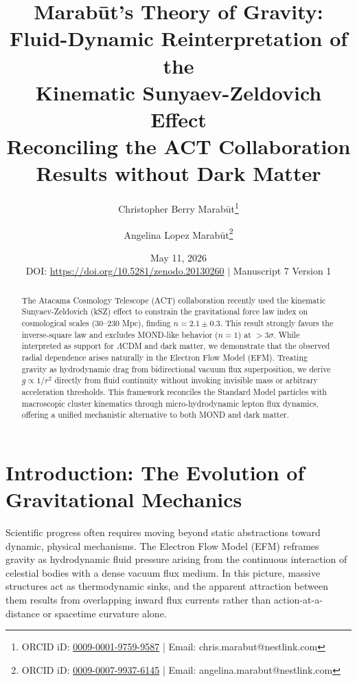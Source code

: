 \documentclass[11pt, a4paper]{article}
\title{\textbf{Marab\={u}t's Theory of Gravity: \\ Fluid-Dynamic Reinterpretation of the \\ Kinematic Sunyaev-Zeldovich Effect} \\[1em] \large{Reconciling the ACT Collaboration Results without Dark Matter}}
\author[1]{Christopher Berry Marab\={u}t\thanks{ORCID iD: \href{https://orcid.org/0009-0001-9759-9587}{0009-0001-9759-9587} | Email: chris.marabut@nestlink.com}}
\author[1]{Angelina Lopez Marab\={u}t\thanks{ORCID iD: \href{https://orcid.org/0009-0007-9937-6145}{0009-0007-9937-6145} | Email: angelina.marabut@nestlink.com}}
\affil[1]{Independent Researchers}
\date{May 11, 2026 \\[1.5em] \small{DOI: \url{https://doi.org/10.5281/zenodo.20130260} $|$ Manuscript 7 Version 1}}
\begin{document}

\maketitle

\begin{abstract}
The Atacama Cosmology Telescope (ACT) collaboration recently used the kinematic Sunyaev-Zeldovich (kSZ) effect to constrain the gravitational force law index on cosmological scales ($30$--$230$ Mpc), finding $n = 2.1 \pm 0.3$. This result strongly favors the inverse-square law and excludes MOND-like behavior ($n=1$) at $>3\sigma$. While interpreted as support for $\Lambda$CDM and dark matter, we demonstrate that the observed radial dependence arises naturally in the Electron Flow Model (EFM). Treating gravity as hydrodynamic drag from bidirectional vacuum flux superposition, we derive $g \propto 1/r^2$ directly from fluid continuity without invoking invisible mass or arbitrary acceleration thresholds. This framework reconciles the Standard Model particles with macroscopic cluster kinematics through micro-hydrodynamic lepton flux dynamics, offering a unified mechanistic alternative to both MOND and dark matter.
\end{abstract}

\section{Introduction: The Evolution of Gravitational Mechanics}
Scientific progress often requires moving beyond static abstractions toward dynamic, physical mechanisms. The Electron Flow Model (EFM) \cite{marabut2026m1} reframes gravity as hydrodynamic fluid pressure arising from the continuous interaction of celestial bodies with a dense vacuum flux medium. In this picture, massive structures act as thermodynamic sinks, and the apparent attraction between them results from overlapping inward flux currents rather than action-at-a-distance or spacetime curvature alone.
\end{document}
